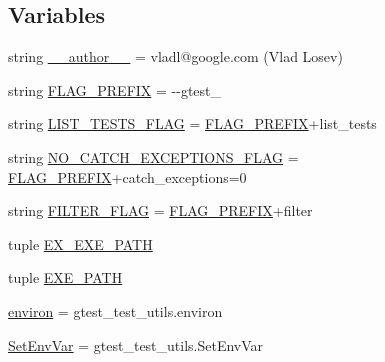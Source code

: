 \subsection*{Variables}
\begin{DoxyCompactItemize}
\item 
string \hyperlink{namespacegtest__catch__exceptions__test_a26e1831a55209b037dc7d8d3ca1e4f32}{\+\_\+\+\_\+author\+\_\+\+\_\+} = \textquotesingle{}vladl@google.\+com (Vlad Losev)\textquotesingle{}
\item 
string \hyperlink{namespacegtest__catch__exceptions__test_a2d40f89077ec9fdb51008c263148315f}{F\+L\+A\+G\+\_\+\+P\+R\+E\+F\+I\+X} = \textquotesingle{}-\/-\/gtest\+\_\+\textquotesingle{}
\item 
string \hyperlink{namespacegtest__catch__exceptions__test_a68601cbcd48065a2f656eb8552784f0c}{L\+I\+S\+T\+\_\+\+T\+E\+S\+T\+S\+\_\+\+F\+L\+A\+G} = \hyperlink{namespacegtest__catch__exceptions__test_a2d40f89077ec9fdb51008c263148315f}{F\+L\+A\+G\+\_\+\+P\+R\+E\+F\+I\+X}+\textquotesingle{}list\+\_\+tests\textquotesingle{}
\item 
string \hyperlink{namespacegtest__catch__exceptions__test_af3e2719448df6b24d78c870e5b586e8b}{N\+O\+\_\+\+C\+A\+T\+C\+H\+\_\+\+E\+X\+C\+E\+P\+T\+I\+O\+N\+S\+\_\+\+F\+L\+A\+G} = \hyperlink{namespacegtest__catch__exceptions__test_a2d40f89077ec9fdb51008c263148315f}{F\+L\+A\+G\+\_\+\+P\+R\+E\+F\+I\+X}+\textquotesingle{}catch\+\_\+exceptions=0\textquotesingle{}
\item 
string \hyperlink{namespacegtest__catch__exceptions__test_a1a53cfa4c10fe3bdbc85a14fd9692751}{F\+I\+L\+T\+E\+R\+\_\+\+F\+L\+A\+G} = \hyperlink{namespacegtest__catch__exceptions__test_a2d40f89077ec9fdb51008c263148315f}{F\+L\+A\+G\+\_\+\+P\+R\+E\+F\+I\+X}+\textquotesingle{}filter\textquotesingle{}
\item 
tuple \hyperlink{namespacegtest__catch__exceptions__test_a4789e6b786fb431c8f4e205ac93782b5}{E\+X\+\_\+\+E\+X\+E\+\_\+\+P\+A\+T\+H}
\item 
tuple \hyperlink{namespacegtest__catch__exceptions__test_a9176972ff83182f11532cbbc27f5cb42}{E\+X\+E\+\_\+\+P\+A\+T\+H}
\item 
\hyperlink{namespacegtest__catch__exceptions__test_ae51b794c28e667016c180f1b3fc85292}{environ} = gtest\+\_\+test\+\_\+utils.\+environ
\item 
\hyperlink{namespacegtest__catch__exceptions__test_a60be14c2b88aafb689ba4d3d2578449e}{Set\+Env\+Var} = gtest\+\_\+test\+\_\+utils.\+Set\+Env\+Var
\item 

\end{DoxyCompactItemize}
